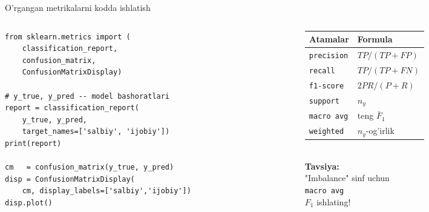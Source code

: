 \documentclass[aspectratio=169,11pt]{beamer}
\begin{document}
\begin{frame}[fragile]{O'rgangan metrikalarni kodda ishlatish}
  \begin{columns}[T]
    \begin{column}{0.57\textwidth}
\begin{lstlisting}
from sklearn.metrics import (
    classification_report,
    confusion_matrix,
    ConfusionMatrixDisplay)

# y_true, y_pred -- model bashoratlari
report = classification_report(
    y_true, y_pred,
    target_names=['salbiy', 'ijobiy'])
print(report)

cm   = confusion_matrix(y_true, y_pred)
disp = ConfusionMatrixDisplay(
    cm, display_labels=['salbiy','ijobiy'])
disp.plot()
\end{lstlisting}
    \end{column}
    \begin{column}{0.40\textwidth}
      \small
      \begin{tabular}{@{}ll@{}}
        \toprule
        Atamalar& Formula \\
        \midrule
        \texttt{precision} & $TP/(TP+FP)$ \\
        \texttt{recall}    & $TP/(TP+FN)$ \\
        \texttt{f1-score}  & $2PR/(P+R)$ \\
        \texttt{support}   & $n_y$ \\
        \texttt{macro avg} & teng $\bar{F}_1$ \\
        \texttt{weighted}  & $n_y$-og'irlik \\
        \bottomrule
      \end{tabular}
      \vspace{5pt}\\
      \small\textbf{Tavsiya:}\\
      "Imbalance" sinf uchun\\
      \texttt{macro avg}\\
      $F_1$ ishlating!
    \end{column}
  \end{columns}
\end{frame}
\end{document}
